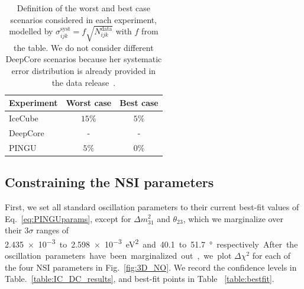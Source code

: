 \documentclass[draft=True]{revtex4-2}
\newcommand{\dm}{\Delta m^2_{31}}
\begin{document}
{\renewcommand{\arraystretch}{1.2}
\begin{table}
   \begin{tabular}{lcc}
      \hline \hline
      Experiment & Worst case & Best case \\
      \hline
      IceCube & $15\%$ & $5\%$ \\
      DeepCore & - & - \\
      PINGU & $5\%$ & $0\%$ \\
      \hline \hline
   \end{tabular}
   \caption{Definition of the worst and best case scenarios considered in each experiment, modelled by $\sigma_{ijk}^\text{syst} = f\sqrt{N_{ijk}^\text{data}}$ with $f$ from the table.
   We do not consider different DeepCore scenarios because her systematic error distribution is already provided in the data release~\cite{DC2019data}.}\label{table:syst_errors}
\end{table}

\subsection{Constraining the NSI parameters}
First, we set all standard oscillation parameters to their current best-fit values of Eq.~\ref{eq:PINGUparams}, except for $\dm$ and $\theta_{23}$, 
which we marginalize over their $3\sigma$ ranges of \SI{2.435e-3} to \SI{2.598e-3}{\electronvolt^2} and \SI{40.1} to \SI{51.7}{\degree} respectively. %
After the oscillation parameters have been marginalized out, we plot $\Delta \chi^2$ for each of the four NSI parameters in Fig.~\ref{fig:3D_NO}. We record the 
confidence levels in Table.~\ref{table:IC_DC_results}, and best-fit points in Table ~\ref{table:bestfit}.

}
\end{document}
